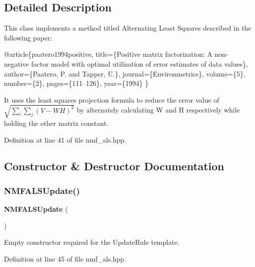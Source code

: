 \subsection{Detailed Description}
This class implements a method titled \textquotesingle{}Alternating Least Squares\textquotesingle{} described in the following paper\+: 


\begin{DoxyCode}
@article\{paatero1994positive,
 title=\{Positive matrix factorization: A non-negative factor model with
     optimal utilization of error estimates of data values\},
 author=\{Paatero, P. and Tapper, U.\},
 journal=\{Environmetrics\},
 volume=\{5\},
 number=\{2\},
 pages=\{111--126\},
 year=\{1994\}
\}
\end{DoxyCode}


It uses the least squares projection formula to reduce the error value of $ \sqrt{\sum_i \sum_j(V-WH)^2} $ by alternately calculating W and H respectively while holding the other matrix constant. 

Definition at line 41 of file nmf\+\_\+als.\+hpp.



\subsection{Constructor \& Destructor Documentation}
\mbox{\label{classmlpack_1_1amf_1_1NMFALSUpdate_a3482d9d8fc18996cee80de1f698b3a09}} 
\subsubsection{N\+M\+F\+A\+L\+S\+Update()}
{\footnotesize\ttfamily \textbf{ N\+M\+F\+A\+L\+S\+Update} (\begin{DoxyParamCaption}{ }\end{DoxyParamCaption})\hspace{0.3cm}{\ttfamily [inline]}}



Empty constructor required for the Update\+Rule template. 



Definition at line 45 of file nmf\+\_\+als.\+hpp.




